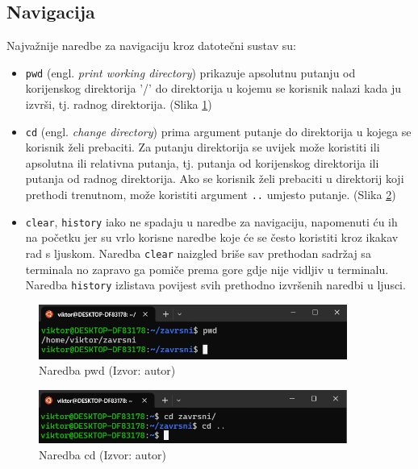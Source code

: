 \documentclass{foi}
\begin{document}
\subsection{Navigacija}
Najvažnije naredbe za navigaciju kroz datotečni sustav su:
\begin{itemize}
    \item \verb|pwd| (engl. \textit{print working directory}) prikazuje apsolutnu putanju od korijenskog direktorija '/' do direktorija u kojemu se korisnik nalazi kada ju izvrši, tj. radnog direktorija. (Slika \ref{fig:pwd})
    \item \verb|cd| (engl. \textit{change directory}) prima argument putanje do direktorija u kojega se korisnik želi prebaciti. Za putanju direktorija se uvijek može koristiti ili apsolutna ili relativna putanja, tj. putanja od korijenskog direktorija ili putanja od radnog direktorija. Ako se korisnik želi prebaciti u direktorij koji prethodi trenutnom, može koristiti argument \verb|..| umjesto putanje. (Slika \ref{fig:cd})
    \item \verb|clear|, \verb|history| iako ne spadaju u naredbe za navigaciju, napomenuti ću ih na početku jer su vrlo korisne naredbe koje će se često koristiti kroz ikakav rad s ljuskom. Naredba \verb|clear| naizgled briše sav prethodan sadržaj sa terminala no zapravo ga pomiče prema gore gdje nije vidljiv u terminalu. Naredba \verb|history| izlistava povijest svih prethodno izvršenih naredbi u ljusci.
\end{itemize}

\begin{figure}[H]
    \centering
    \includegraphics[width=0.9\textwidth]{slike/pwd.png}
    \caption{Naredba pwd (Izvor: autor)}
    \label{fig:pwd}
\end{figure}
\begin{figure}[h!]
    \centering
    \includegraphics[width=0.9\textwidth]{slike/cd.png}
    \caption{Naredba cd (Izvor: autor)}
    \label{fig:cd}
\end{figure}
\end{document}
